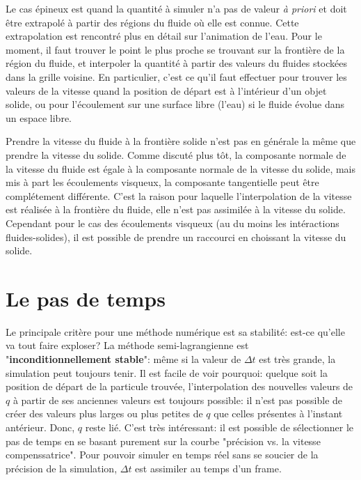 \documentclass[11pt]{report}
\begin{document}
Le cas épineux est quand la quantité à simuler n'a pas de valeur \textit{à priori} et doit être extrapolé à partir des régions du fluide où elle est connue. Cette extrapolation est rencontré plus en détail sur l'animation de l'eau. Pour le moment, il faut trouver le point le plus proche se trouvant sur la frontière de la région du fluide, et interpoler la quantité à partir des valeurs du fluides stockées dans la grille voisine. En particulier, c'est ce qu'il faut effectuer pour trouver les valeurs de la vitesse quand la position de départ est à l'intérieur d'un objet solide, ou pour l'écoulement sur une surface libre (l'eau) si le fluide évolue dans un espace libre.\newline

Prendre la vitesse du fluide à la frontière solide n'est pas en générale la même que prendre la vitesse du solide. Comme discuté plus tôt, la composante normale de la vitesse du fluide est égale à la composante normale de la vitesse du solide, mais mis à part les écoulements visqueux, la composante tangentielle peut être complétement différente. C'est la raison pour laquelle l'interpolation de la vitesse est réalisée à la frontière du fluide, elle n'est pas assimilée à la vitesse du solide. Cependant pour le cas des écoulements visqueux (au du moins les intéractions fluides-solides), il est possible de prendre un raccourci en choissant la vitesse du solide.

\section{Le pas de temps}

Le principale critère pour une méthode numérique est sa stabilité: est-ce qu'elle va tout faire exploser? La méthode semi-lagrangienne est "\textbf{inconditionnellement stable}": même si la valeur de $\Delta t$ est très grande, la simulation peut toujours tenir. Il est facile de voir pourquoi: quelque soit la position de départ de la particule trouvée, l'interpolation des nouvelles valeurs de $q$ à partir de ses anciennes valeurs est toujours possible: il n'est pas possible de créer des valeurs plus larges ou plus petites de $q$ que celles présentes à l'instant antérieur. Donc, $q$ reste lié. C'est très intéressant: il est possible de sélectionner le pas de temps en se basant purement sur la courbe "précision vs. la vitesse compenssatrice". Pour pouvoir simuler en temps réel sans se soucier de la précision de la simulation, $\Delta t$ est assimiler au temps d'un frame.\newline
\end{document}
